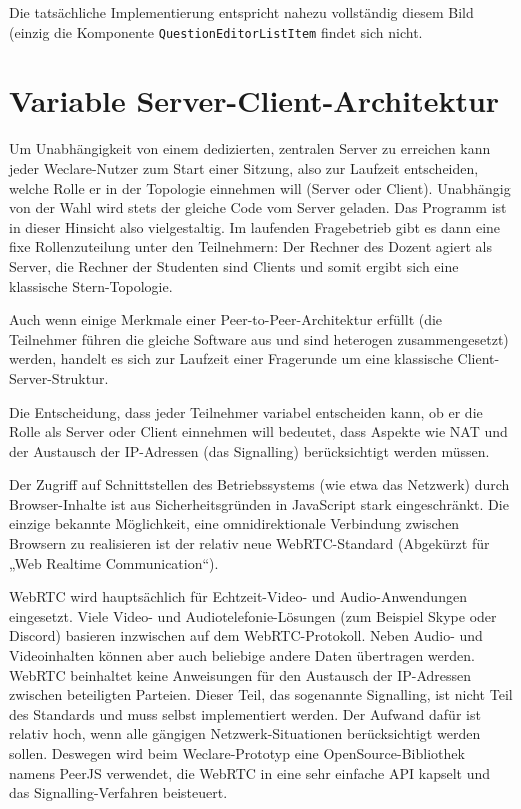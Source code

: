 Die tatsächliche Implementierung entspricht nahezu vollständig diesem Bild (einzig die Komponente \texttt{QuestionEditorListItem} findet sich nicht.

%
\section{Variable Server-Client-Architektur}
\label{chap:p2p}
Um Unabhängigkeit von einem dedizierten, zentralen Server zu erreichen kann jeder Weclare-Nutzer zum Start einer Sitzung, also zur Laufzeit entscheiden, welche Rolle er in der Topologie einnehmen will (Server oder Client). Unabhängig von der Wahl wird stets der gleiche Code vom Server geladen. Das Programm ist in dieser Hinsicht also vielgestaltig. Im laufenden Fragebetrieb gibt es dann eine fixe Rollenzuteilung unter den Teilnehmern: Der Rechner des Dozent agiert als Server, die Rechner der Studenten sind Clients und somit ergibt sich eine klassische Stern-Topologie.

Auch wenn einige Merkmale einer Peer-to-Peer-Architektur erfüllt (die Teilnehmer führen die gleiche Software aus und sind heterogen zusammengesetzt) werden, handelt es sich zur Laufzeit einer Fragerunde um eine klassische Client-Server-Struktur.

Die Entscheidung, dass jeder Teilnehmer variabel entscheiden kann, ob er die Rolle als Server oder Client einnehmen will bedeutet, dass Aspekte wie NAT und der Austausch der IP-Adressen (das Signalling) berücksichtigt werden müssen.

Der Zugriff auf Schnittstellen des Betriebssystems (wie etwa das Netzwerk) durch Browser-Inhalte ist aus Sicherheitsgründen in JavaScript stark eingeschränkt. Die einzige bekannte Möglichkeit, eine omnidirektionale Verbindung zwischen Browsern zu realisieren ist der relativ neue WebRTC-Standard (Abgekürzt für „Web Realtime Communication“).

WebRTC wird hauptsächlich für Echtzeit-Video- und Audio-Anwendungen eingesetzt. Viele Video- und Audiotelefonie-Lösungen (zum Beispiel Skype oder Discord) basieren inzwischen auf dem WebRTC-Protokoll. Neben Audio- und Videoinhalten können aber auch beliebige andere Daten übertragen werden. WebRTC beinhaltet keine Anweisungen für den Austausch der IP-Adressen zwischen beteiligten Parteien. Dieser Teil, das sogenannte Signalling, ist nicht Teil des Standards und muss selbst implementiert werden. Der Aufwand dafür ist relativ hoch, wenn alle gängigen Netzwerk-Situationen berücksichtigt werden sollen. Deswegen wird beim Weclare-Prototyp eine OpenSource-Bibliothek namens PeerJS verwendet, die WebRTC in eine sehr einfache API kapselt und das Signalling-Verfahren beisteuert.

